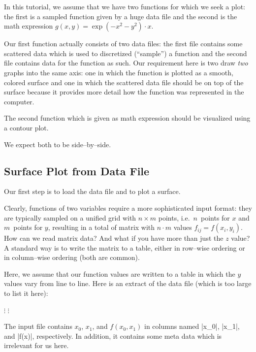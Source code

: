 
In this tutorial, we assume that we have two functions for which we seek a plot: the first is a sampled function given by a huge data file and the second is the math expression $g(x,y)=\exp(-x^2-y^2)\cdot x$. 

Our first function actually consists of two data files: the first file contains some scattered data which is used to discretized (``sample'') a function and the second file contains data for the function as such. 
Our requirement here is two draw \emph{two} graphs into the same axis: one in which the function is plotted as a smooth, colored surface and one in which the scattered data file should be on top of the surface because it provides more detail how the function was represented in the computer. 

The second function which is given as math expression should be visualized using a contour plot. 

We expect both to be side--by--side.


\subsection{Surface Plot from Data File}
Our first step is to load the data file and to plot a surface. 

Clearly, functions of two variables require a more sophisticated input format: they are typically sampled on a unified grid with $n \times m$ points, i.e.\ $n$~points for $x$ and $m$~points for $y$, resulting in a total of matrix with $n\cdot m$ values $f_{ij} = f(x_i,y_i)$. How can we read matrix data? And what if you have more than just the $z$ value? A standard way is to write the matrix to a table, either in row--wise ordering or in column--wise ordering (both are common). 

Here, we assume that our function values are written to a table in which the $y$ values vary from line to line. Here is an extract of the data file (which is too large to list it here):

    \baselineskip
    $\vdots$
    \baselineskip
    \baselineskip
    $\vdots$

The input file contains $x_0$, $x_1$, and $f(x_0,x_1)$ in columns named |x_0|, |x_1|, and |f(x)|, respectively. In addition, it contains some meta data which is irrelevant for us here.


